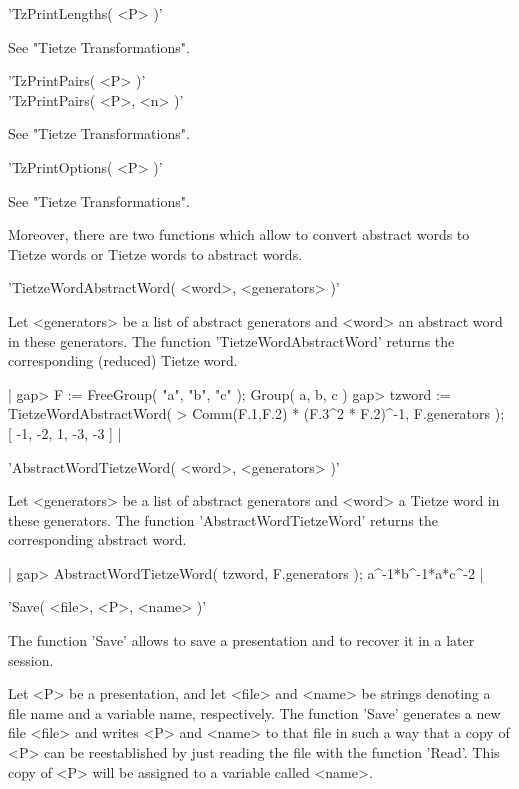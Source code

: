 \vspace{5mm}
'TzPrintLengths( <P> )'

See "Tietze Transformations".

\vspace{5mm}
'TzPrintPairs( <P> )' \\
'TzPrintPairs( <P>, <n> )'

See "Tietze Transformations".

\vspace{5mm}
'TzPrintOptions( <P> )'

See "Tietze Transformations".

Moreover, there  are two functions  which allow to convert abstract words
to Tietze words or Tietze words to abstract words.

\vspace{5mm}
'TietzeWordAbstractWord( <word>, <generators> )'%

Let <generators> be a list of abstract  generators and <word> an abstract
word in  these generators.  The function 'TietzeWordAbstractWord' returns
the corresponding (reduced) Tietze word.

|    gap> F := FreeGroup( "a", "b", "c" );
    Group( a, b, c )
    gap> tzword := TietzeWordAbstractWord(
    >  Comm(F.1,F.2) * (F.3^2 * F.2)^-1, F.generators );
    [ -1, -2, 1, -3, -3 ] |

\vspace{5mm}
'AbstractWordTietzeWord( <word>, <generators> )'%

Let <generators>  be a list of  abstract  generators and  <word> a Tietze
word in these  generators.  The function 'AbstractWordTietzeWord' returns
the corresponding abstract word.

|    gap> AbstractWordTietzeWord( tzword, F.generators );
    a^-1*b^-1*a*c^-2 |

\vspace{5mm}
'Save( <file>, <P>, <name> )'%

The function 'Save' allows to save a presentation and to  recover it in a
later {\GAP} session.

Let <P> be a presentation, and let  <file> and <name> be strings denoting
a file  name  and a   variable name,  respectively.   The function 'Save'
generates a new  file <file> and  writes <P>  and <name> to  that file in
such  a way that a  copy of <P> can be  reestablished by just reading the
file with  the function 'Read'. This  copy of <P>  will be assigned  to a
variable called <name>.

